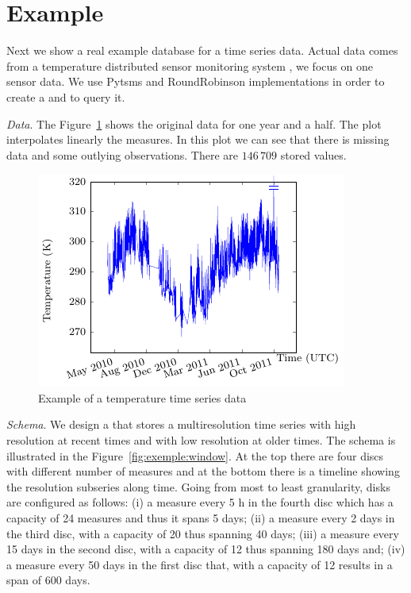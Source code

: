 


\section{Example}
\label{sec:example}


Next we show a real example database for a time series data. Actual
data comes from a temperature distributed sensor monitoring system
\cite{alippi10}, we focus on one sensor data. We use Pytsms and
RoundRobinson implementations in order to create a  and
to query it.

\emph{Data}. The Figure~\ref{fig:exemple:original} shows the original
data for one year and a half. The plot interpolates linearly the
measures. In this plot we can see that there is missing data and some
outlying observations. There are $146\,709$ stored values.

\begin{figure}[tp]
  \centering
  \includegraphics{fig_exemple_original.pdf}
  \caption{Example of a temperature time series data}
  \label{fig:exemple:original}
\end{figure}

\emph{Schema}. We design a  that stores a multiresolution
time series with high resolution at recent times and with low
resolution at older times. The schema is illustrated in the
Figure~\ref{fig:exemple:window}. At the top there are four discs with
different number of measures and at the bottom there is a timeline
showing the resolution subseries along time. Going from most to least
granularity, disks are configured as follows: (i) a measure every 5 h
in the fourth disc which has a capacity of 24 measures and thus it
spans 5 days; (ii) a measure every 2 days in the third disc, with a
capacity of 20 thus spanning 40 days; (iii) a measure every 15 days in
the second disc, with a capacity of 12 thus spanning 180 days and;
(iv) a measure every 50 days in the first disc that, with a capacity
of 12 results in a span of 600 days.

